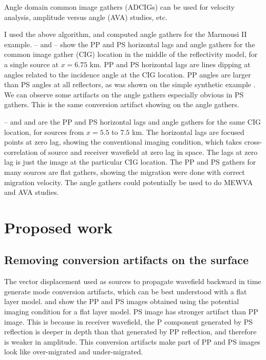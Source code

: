 Angle domain common image gathers (ADCIGs) can be used for velocity analysis, amplitude versus angle (AVA) studies, etc. 

I used the above algorithm, and computed angle gathers for the Marmousi II example. -- and -- show the PP and PS horizontal lags and angle gathers for the common image gather (CIG) location in the middle of the reflectivity model, for a single source at $x=6.75$ km. PP and PS horizontal lags are lines dipping at angles related to the incidence angle at the CIG location. PP angles are larger than PS angles at all reflectors, as was shown on the simple synthetic example . We can observe some artifacts on the angle gathers especially obvious in PS gathers. This is the same conversion artifact showing on the angle gathers.

-- and  and  are the PP and PS horizontal lags and angle gathers for the same CIG location, for sources from $x=5.5$ to $7.5$ km. 
The horizontal lags are focused points at zero lag, showing the conventional imaging condition, which takes cross-correlation of source and receiver wavefield at zero lag in space. The lags at zero lag is just the image at the particular CIG location. The PP and PS gathers for many sources are flat gathers, showing the migration were done with correct migration velocity. The angle gathers could potentially be used to do MEWVA and AVA studies.


\section{Proposed work}

\subsection{Removing conversion artifacts on the surface}
The vector displacement used as sources to propagate wavefield backward in time generate mode conversion artifacts, which can be best understood with a flat layer model. 
 and  show the PP and PS images obtained using the potential imaging condition for a flat layer model. PS image has stronger artifact than PP image. This is because in receiver wavefield, the P component generated by PS reflection is deeper in depth than that generated by PP reflection, and therefore is weaker in amplitude.
This conversion artifacts make part of PP and PS images look like over-migrated and under-migrated. 

